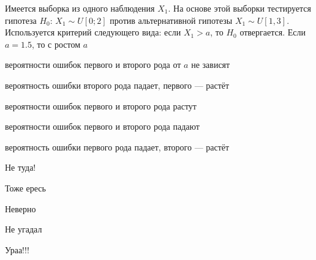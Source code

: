
\begin{question}
Имеется выборка из одного наблюдения \(X_1\). На основе этой выборки
тестируется гипотеза \(H_0\): \(X_1 \sim U[0;2]\) против альтернативной
гипотезы \(X_1 \sim U[1,3]\). Используется критерий следующего вида:
если \(X_1>a\), то \(H_0\) отвергается. Если \(a=1.5\), то с ростом
\(a\)
\begin{answerlist}
  \item вероятности ошибок первого и второго рода от \(a\) не зависят
  \item вероятность ошибки второго рода падает, первого --- растёт
  \item вероятности ошибок первого и второго рода растут
  \item вероятности ошибок первого и второго рода падают
  \item вероятность ошибки первого рода падает, второго --- растёт
\end{answerlist}
\end{question}

\begin{solution}
\begin{answerlist}
  \item Не туда!
  \item Тоже ересь
  \item Неверно
  \item Не угадал
  \item Ураа!!!
\end{answerlist}
\end{solution}

